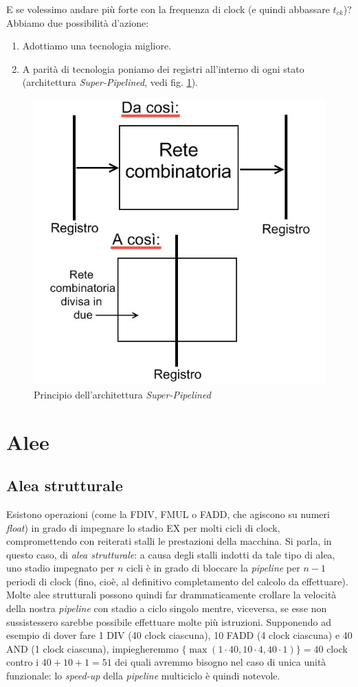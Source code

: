 E se volessimo andare più forte con la frequenza di clock (e quindi abbassare $t_{ck}$)? Abbiamo due possibilità d'azione:
\begin{enumerate}
\item Adottiamo una tecnologia migliore.
\item A parità di tecnologia poniamo dei registri all'interno di ogni stato (architettura \textit{Super-Pipelined}, vedi fig. \ref{fig:superpipeline}).
\end{enumerate}
\begin{figure}[!h]
\centering
\includegraphics[width=0.5\columnwidth]{img/superpipeline}
\caption{Principio dell'architettura \textit{Super-Pipelined}}
\label{fig:superpipeline}
\end{figure}

\section{Alee}
\label{sec:alee}

\subsection{Alea strutturale}
\label{sec:aleaStrutturale}

Esistono operazioni (come la FDIV, FMUL o FADD, che agiscono su numeri \textit{float}) in grado di impegnare lo stadio EX per molti cicli di clock, compromettendo con reiterati stalli le prestazioni della macchina. Si parla, in questo caso, di \textit{alea strutturale}: a causa degli stalli indotti da tale tipo di alea, uno stadio impegnato per $n$ cicli è in grado di bloccare la \textit{pipeline} per $n-1$ periodi di clock (fino, cioè, al definitivo completamento del calcolo da effettuare). Molte alee strutturali possono quindi far drammaticamente crollare la velocità della nostra \textit{pipeline} con stadio a ciclo singolo mentre, viceversa, se esse non sussistessero sarebbe possibile effettuare molte più istruzioni. Supponendo ad esempio di dover fare 1 DIV (40 clock ciascuna), 10 FADD (4 clock ciascuna) e 40 AND (1 clock ciascuna), impiegheremmo $\{\max \left( {1 \cdot 40,10 \cdot 4,40 \cdot 1} \right)\} = 40$ clock contro i $40+10+1=51$ dei quali avremmo bisogno nel caso di unica unità funzionale: lo \textit{speed-up} della \textit{pipeline} multiciclo è quindi notevole. 

